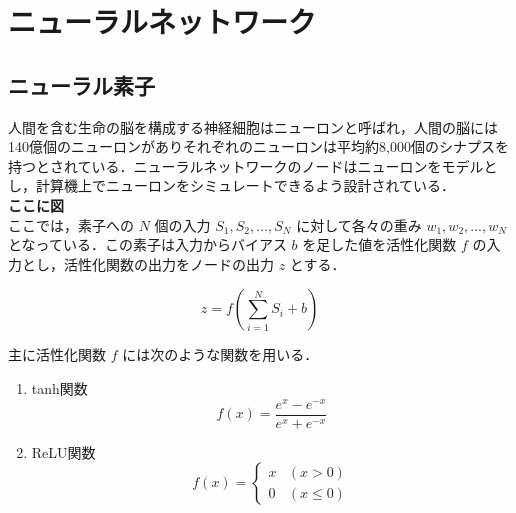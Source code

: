 \section{ニューラルネットワーク}
\subsection{ニューラル素子}
人間を含む生命の脳を構成する神経細胞はニューロンと呼ばれ，人間の脳には140億個のニューロンがありそれぞれのニューロンは平均約8,000個のシナプスを持つとされている．ニューラルネットワークのノードはニューロンをモデルとし，計算機上でニューロンをシミュレートできるよう設計されている．
\\ \textbf{ここに図} \\
ここでは，素子への $ N $ 個の入力 $ S_1, S_2, ..., S_N $ に対して各々の重み $ w_1, w_2, ..., w_N $ となっている．この素子は入力からバイアス $ b $ を足した値を活性化関数 $ f $ の入力とし，活性化関数の出力をノードの出力 $ z $ とする．

\begin{equation}
    z = f(\sum_{i=1}^N S_i + b)
\end{equation}

主に活性化関数 $ f $ には次のような関数を用いる．

\begin{enumerate}
    \item tanh関数
    \begin{equation}
        f(x) = \frac{e^{x} - e^{-x}}{e^{x} + e^{-x}}
    \end{equation}

    \item ReLU関数
    \begin{equation}
        f(x) = 
        \begin{cases}
        x & (x > 0)\\
        0 & (x \leq 0)
        \end{cases}
    \end{equation}
\end{enumerate}